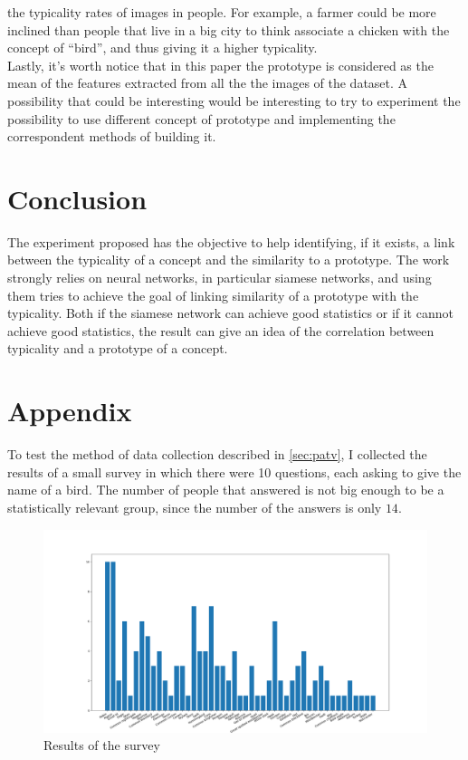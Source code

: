 \documentclass[conference]{IEEEtran}
\begin{document}
			the typicality rates of images in people. For example, a farmer could be more inclined than people that live in a big city to think associate a chicken with the concept of ``bird'', and thus giving 
			it a higher typicality.\\
			Lastly, it's worth notice that in this paper the prototype is considered as the mean of the features extracted from all the the images of the dataset. A possibility that could be interesting would be 
			interesting to try to experiment the possibility to use different concept of prototype and implementing the correspondent methods of building it.\\
			
	\section{Conclusion}

		The experiment proposed has the objective to help identifying, if it exists, a link between the typicality of a concept and the similarity to a prototype. The work strongly relies on neural networks, in 
		particular siamese networks, and using them tries to achieve the goal of linking similarity of a prototype with the typicality. Both if the siamese network can achieve good statistics or if it cannot achieve 
		good statistics, the result can give an idea of the correlation between typicality and a prototype of a concept. 

	\appendix
	
	\section{Appendix\label{sec:app}}
	
		To test the method of data collection described in \ref{sec:patv}, I collected the results of a small survey in which there were 10 questions, each asking to give the name of a bird. The number of 
		people that answered is not big enough to be a statistically relevant group, since the number of the answers is only $14$.
	
		\begin{figure}
			\centerline{\includegraphics[width=\linewidth]{imgs/survey_hist.png}}
			\caption{Results of the survey}
			\label{fig:app}
		\end{figure}
		
\end{document}
